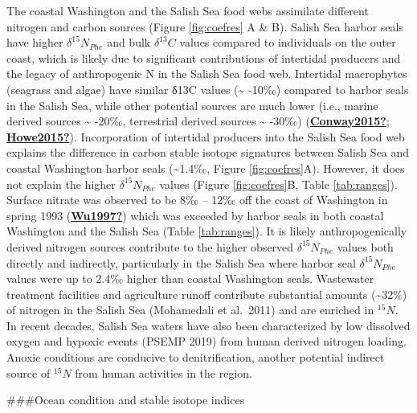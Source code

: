 \documentclass [11pt, proquest] {uwthesis}[2015/03/03]
\begin{document}
The coastal Washington and the Salish Sea food webs assimilate different nitrogen and carbon sources (Figure \ref{fig:coefres} A \& B). Salish Sea harbor seals have higher \(\delta^{15}N_{Phe}\) and bulk \(\delta^{13}C\) values compared to individuals on the outer coast, which is likely due to significant contributions of intertidal producers and the legacy of anthropogenic N in the Salish Sea food web. Intertidal macrophytes (seagrass and algae) have similar δ13C values (\textasciitilde{} -10‰) compared to harbor seals in the Salish Sea, while other potential sources are much lower (i.e., marine derived sources \textasciitilde{} -20‰, terrestrial derived sources \textasciitilde{} -30‰) (\protect\hyperlink{ref-Conway2015}{\textbf{Conway2015?}}; \protect\hyperlink{ref-Howe2015}{\textbf{Howe2015?}}). Incorporation of intertidal producers into the Salish Sea food web explains the difference in carbon stable isotope signatures between Salish Sea and coastal Washington harbor seals (\textasciitilde1.4‰, Figure \ref{fig:coefres}A). However, it does not explain the higher \(\delta^{15}N_{Phe}\) values (Figure \ref{fig:coefres}B, Table \ref{tab:ranges}). Surface nitrate was observed to be 8‰ -- 12‰ off the coast of Washington in spring 1993 (\protect\hyperlink{ref-Wu1997}{\textbf{Wu1997?}}) which was exceeded by harbor seals in both coastal Washington and the Salish Sea (Table \ref{tab:ranges}). It is likely anthropogenically derived nitrogen sources contribute to the higher observed \(\delta^{15}N_{Phe}\) values both directly and indirectly, particularly in the Salish Sea where harbor seal \(\delta^{15}N_{Phe}\) values were up to 2.4‰ higher than coastal Washington seals. Wastewater treatment facilities and agriculture runoff contribute substantial amounts (\textasciitilde32\%) of nitrogen in the Salish Sea (Mohamedali et al.~2011) and are enriched in \(^{15}N\). In recent decades, Salish Sea waters have also been characterized by low dissolved oxygen and hypoxic events (PSEMP 2019) from human derived nitrogen loading. Anoxic conditions are conducive to denitrification, another potential indirect source of \(^{15}N\) from human activities in the region.

\#\#\#Ocean condition and stable isotope indices
\end{document}
